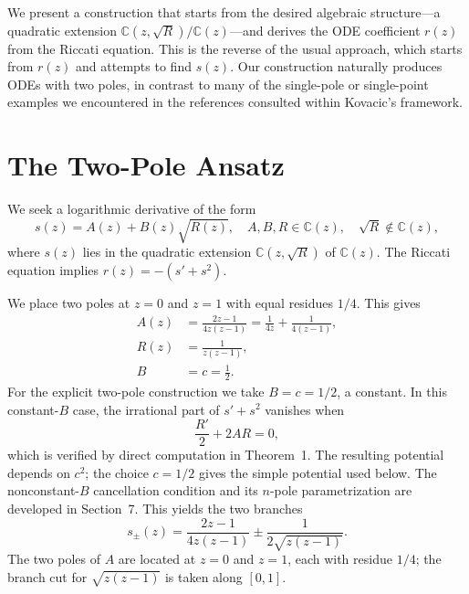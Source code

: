 \documentclass[11pt,a4paper]{article}
\theoremstyle{definition}
\begin{document}
We present a construction that starts from the desired algebraic structure---a quadratic extension \(\mathbb{C}(z, \sqrt{R})/\mathbb{C}(z)\)---and derives the ODE coefficient \(r(z)\) from the Riccati equation. This is the reverse of the usual approach, which starts from \(r(z)\) and attempts to find \(s(z)\). Our construction naturally produces ODEs with two poles, in contrast to many of the single-pole or single-point examples we encountered in the references consulted within Kovacic's framework.

\section{The Two-Pole Ansatz}

We seek a logarithmic derivative of the form
\begin{equation}
s(z) = A(z) + B(z)\sqrt{R(z)}, \quad A, B, R \in \mathbb{C}(z), \quad \sqrt{R} \notin \mathbb{C}(z),
\end{equation}
where \(s(z)\) lies in the quadratic extension \(\mathbb{C}(z, \sqrt{R})\) of \(\mathbb{C}(z)\). The Riccati equation implies \(r(z) = -(s' + s^2)\).

We place two poles at \(z=0\) and \(z=1\) with equal residues \(1/4\). This gives
\begin{align}
A(z) &= \frac{2z-1}{4z(z-1)} = \frac{1}{4z} + \frac{1}{4(z-1)}, \label{eq:defA} \\
R(z) &= \frac{1}{z(z-1)}, \label{eq:defR} \\
B &= c = \frac{1}{2}. \label{eq:defB}
\end{align}
For the explicit two-pole construction we take \(B=c=1/2\), a constant. In this constant-\(B\) case, the irrational part of \(s'+s^2\) vanishes when
\begin{equation}
\frac{R'}{2} + 2AR = 0,
\end{equation}
which is verified by direct computation in Theorem~1. The resulting potential depends on \(c^2\); the choice \(c=1/2\) gives the simple potential used below. The nonconstant-\(B\) cancellation condition and its \(n\)-pole parametrization are developed in Section~7. This yields the two branches
\begin{equation}
s_{\pm}(z) = \frac{2z-1}{4z(z-1)} \pm \frac{1}{2\sqrt{z(z-1)}}. \label{eq:branchesS}
\end{equation}
The two poles of \(A\) are located at \(z=0\) and \(z=1\), each with residue \(1/4\); the branch cut for \(\sqrt{z(z-1)}\) is taken along $[0, 1]$.
\end{document}
